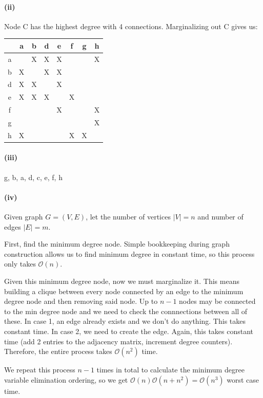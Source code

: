 \documentclass[12pt]{article}
\begin{document}
\paragraph{(ii)}
Node C has the highest degree with 4 connections. Marginalizing out C gives us:

\begin{tabular}{| c || c | c | c | c | c | c | c |}
\hline
& a & b & d & e & f & g & h \\
\hline \hline
a & & X & X & X & & & X \\
\hline
b & X & & X & X & & & \\
\hline
d & X & X & & X & & & \\
\hline
e & X & X & X & & X & & \\
\hline
f & & & & X & & & X  \\
\hline
g & & & & & & & X \\
\hline
h & X & & & & X & X & \\
\hline
\end{tabular}

\paragraph{(iii)}
g, b, a, d, c, e, f, h

\paragraph{(iv)}
Given graph $G = (V, E)$, let the number of vertices $|V| = n$ and number of
edges $|E| = m$.

First, find the minimum degree node. Simple bookkeeping during graph
construction allows us to find minimum degree in constant time, so this
process only takes $\mathcal{O}(n)$.

Given this minimum degree node, now we must marginalize it. This means building
a clique between every node connected by an edge to the minimum degree node and
then removing said node. Up to $n-1$ nodes may be connected to the min degree
node and we need to check the connnections between all of these. In case 1, an
edge already exists and we don't do anything. This takes constant time. In case
2, we need to create the edge. Again, this takes constant time (add 2 entries
to the adjacency matrix, increment degree counters). Therefore, the entire
process takes $\mathcal{O}(n^2)$ time.

We repeat this process $n-1$ times in total to calculate the minimum degree
variable elimination ordering, so we get $\mathcal{O}(n)\mathcal{O}(n + n^2)
= \mathcal{O}(n^3)$ worst case time.
\end{document}
